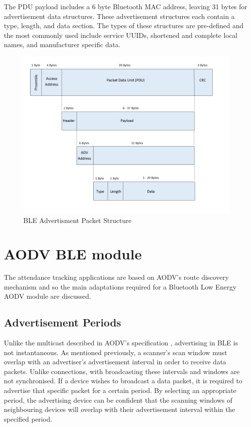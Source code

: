     The PDU payload includes a 6 byte Bluetooth MAC address, leaving 31 bytes
    for advertisement data structures. These advertisement structures each contain
    a type, length, and data section. The types of these structures are pre-defined
    and the most commonly used include service UUIDs, shortened and complete
    local names, and manufacturer specific data.

    \FloatBarrier
    \begin{figure}[ht]
      \includegraphics[width=\textwidth]{Images/chapter3/ble_pkt.png}
      \caption{BLE Advertisment Packet Structure}
      \label{fig:ble_pkt}
    \end{figure}
    \FloatBarrier

    \section{AODV BLE module}
    The attendance tracking applications are based on AODV's route discovery
    mechanism and so the main adaptations required for a Bluetooth Low Energy AODV module
    are discussed.

      \subsection{Advertisement Periods} \label{adv_periods}
    Unlike the multicast described in AODV's specification \cite{RFC3561},
    advertising in BLE is not instantaneous. As mentioned previously, a scanner's
    scan window must overlap with an advertiser's advertisement interval in order
    to receive data packets. Unlike connections, with broadcasting these intervals
    and windows are not synchronised. If a device wishes to broadcast a data packet,
    it is required to advertise that specific packet for a certain period. By selecting
    an appropriate period, the advertising device can be confident that the scanning
    windows of neighbouring devices will overlap with their advertisement interval
    within the specified period.

